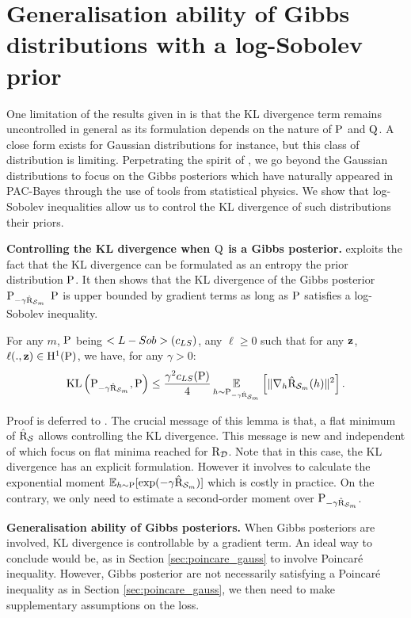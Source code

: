 \section{Generalisation ability of Gibbs distributions with a log-Sobolev prior}
\label{sec:gibbs}

One limitation of the results given in  is that the KL divergence term remains uncontrolled in general as its formulation depends on the nature of $\P$ and $\Q$.
A close form exists for Gaussian distributions for instance, but this class of distribution is limiting. 
Perpetrating the spirit of \citet{catoni2007pac}, we go beyond the Gaussian distributions to focus on the Gibbs posteriors which have naturally appeared in PAC-Bayes through the use of tools from statistical physics. We show that log-Sobolev inequalities allow us to control the KL divergence of such distributions \wrt their priors.

\textbf{Controlling the KL divergence when $\Q$ is a Gibbs posterior.}
 exploits the fact that the KL divergence can be formulated as an entropy \wrt the prior distribution $\P$. It then shows that the KL divergence of the Gibbs posterior $\P_{-\gamma \hat{\Risk}_{\S_m}}$ \wrt $\P$ is upper bounded by gradient terms as long as $\P$ satisfies a log-Sobolev inequality. 
\begin{lemma}
  \label{l: kl_bound}
  For any $m$, $\P$ being $\Lsob(c_{LS})$, any $\ell\geq 0$ such that for any $\z$, $\ell(.,\z) \in \mathrm{H}^{1}(\P)$, we have, for any $\gamma>0$:
  \[ \KL\LP \P_{-\gamma \hat{\Risk}_{\S_m}},\P\RP \leq \frac{\gamma^2 c_{LS}(\P)}{4} \EE_{h\sim \P_{-\gamma \hat{\Risk}_{\S_m}}}\LB \|\nabla_h \hat{\Risk}_{\S_m}(h) \|^2 \RB.\]
\end{lemma}
Proof is deferred to . The crucial message of this lemma is that, a flat minimum of $\hat{\Risk}_\S$ allows controlling the KL divergence. This message is new and independent of  which focus on flat minima reached for $\Risk_\D$.
Note that in this case, the KL divergence has an explicit formulation. However it involves to calculate the exponential moment $\mathbb{E}_{h\sim \P}[\exp(-\gamma \hat{\Risk}_{\S_m})]$ which is costly in practice. On the contrary, we only need to estimate a second-order moment over $\P_{-\gamma \hat{\Risk}_{\S_m}}$.

\noindent\textbf{Generalisation ability of Gibbs posteriors.}
When Gibbs posteriors are involved, KL divergence is controllable by a gradient term. An ideal way to conclude would be, as in Section \ref{sec:poincare_gauss} to involve Poincaré inequality. However, Gibbs posterior are not necessarily satisfying a Poincaré inequality as in Section \ref{sec:poincare_gauss}, we then need to make supplementary assumptions on the loss.



